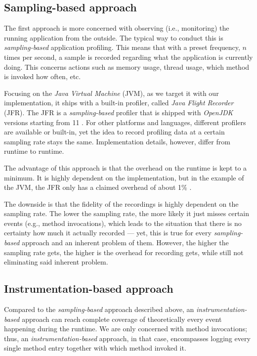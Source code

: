 \documentclass[12pt,a4paper]{report}
\begin{document}
\subsection{Sampling\hyp based approach}

The first approach is more concerned with observing (i.e., monitoring) the
running application from the outside. The typical way to conduct this is
\textit{sampling\hyp based} application profiling. This means that with a
preset frequency, \(n\) times per second, a sample is recorded regarding what
the application is currently doing. This concerns actions such as memory usage,
thread usage, which method is invoked how often, etc.

Focusing on the \textit{Java Virtual Machine} (JVM), as we target it with our
implementation, it ships with a built-in profiler, called \textit{Java Flight
Recorder} (JFR). The JFR is a \textit{sampling\hyp based} profiler that is
shipped with \textit{OpenJDK} versions starting from 11 \cite{openjdk-jfr}. For
other platforms and languages, different profilers are available or built-in,
yet the idea to record profiling data at a certain sampling rate stays the
same. Implementation details, however, differ from runtime to runtime.

The advantage of this approach is that the overhead on the runtime is kept to a
minimum. It is highly dependent on the implementation, but in the example of
the JVM, the JFR only has a claimed overhead of about 1\% \cite{openjdk-jfr}.

The downside is that the fidelity of the recordings is highly dependent on the
sampling rate. The lower the sampling rate, the more likely it just misses
certain events (e.g., method invocations), which leads to the situation that
there is no certainty how much it actually recorded --- yet, this is true for
every \textit{sampling\hyp based} approach and an inherent problem of them.
However, the higher the sampling rate gets, the higher is the overhead for
recording gets, while still not eliminating said inherent problem.


\subsection{Instrumentation\hyp based approach}

Compared to the \textit{sampling\hyp based} approach described above, an
\textit{instrumentation\hyp based} approach can reach complete coverage of
theoretically every event happening during the runtime. We are only concerned
with method invocations; thus, an \textit{instrumentation\hyp based} approach,
in that case, encompasses logging every single method entry together with which
method invoked it.
\end{document}

